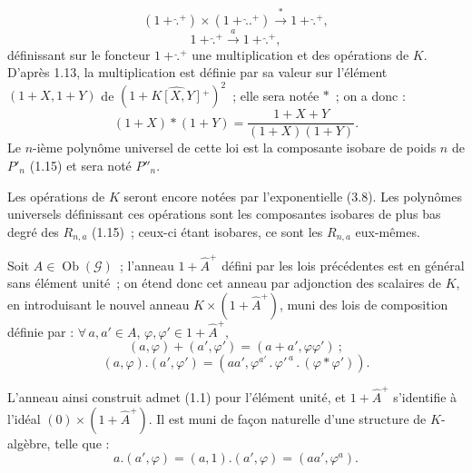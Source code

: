
\[
  (1+\widehat{\mathord{.}}{}^{+})\times(1+\widehat{\mathord{.}}\mathord{.}{}^{+})\xrightarrow{\ \ast\ }1+\widehat{\mathord{.}}{}^{+},
\]
\[
  1+\widehat{\mathord{.}}{}^{+}\xrightarrow{\ a\ }1+\widehat{\mathord{.}}{}^{+},
\]
définissant sur le foncteur \(1+\widehat{\mathord{.}}{}^{+}\) une multiplication et des opérations de \(K\). D'après 1.13, la multiplication est définie par sa valeur sur l'élément \((1+X,1+Y)\) de \((1+\widehat{K[X,Y]}{}^{+})^{2}\)~; elle sera notée \(\ast\)~; on a donc :
\begin{equation}\tag{6.1.1}
  (1+X)\ast(1+Y)=\frac{1+X+Y}{(1+X)(1+Y)}.
\end{equation}
Le \(n\)-ième polynôme universel de cette loi est la composante isobare de poids \(n\) de \(P'_n\) (1.15) et sera noté \(P''_n\).

Les opérations de \(K\) seront encore notées par l'exponentielle (3.8). Les polynômes universels définissant ces opérations sont les composantes isobares de plus bas degré des \(R_{n,a}\) (1.15)~; ceux-ci étant isobares, ce sont les \(R_{n,a}\) eux-mêmes.

Soit \(A\in\operatorname{Ob}(\mathcal G)\)~; l'anneau \(1+\widehat A^{+}\) défini par les lois précédentes est en général sans élément unité~; on étend donc cet anneau par adjonction des scalaires de \(K\), en introduisant le nouvel anneau \(K\times(1+\widehat A^{+})\), muni des lois de composition définie par : \(\forall\,a,a'\in A\), \(\varphi,\varphi'\in1+\widehat A^{+}\),
\[
  (a,\varphi)+(a',\varphi')=(a+a',\varphi\varphi')~;
\]
\begin{equation}\tag{6.1.2}
  (a,\varphi).(a',\varphi')=(aa',\varphi^{a'}\mathbin{.}{\varphi'}^{\,a}\mathbin{.}(\varphi\ast\varphi')).
\end{equation}

L'anneau ainsi construit admet (1.1) pour l'élément unité, et \(1+\widehat A^{+}\) s'identifie à l'idéal \((0)\times(1+\widehat A^{+})\). Il est muni de façon naturelle d'une structure de \(K\)-algèbre, telle que :
\begin{equation}\tag{6.1.3}
  a.(a',\varphi)=(a,1).(a',\varphi)=(aa',\varphi^{a}).
\end{equation}

